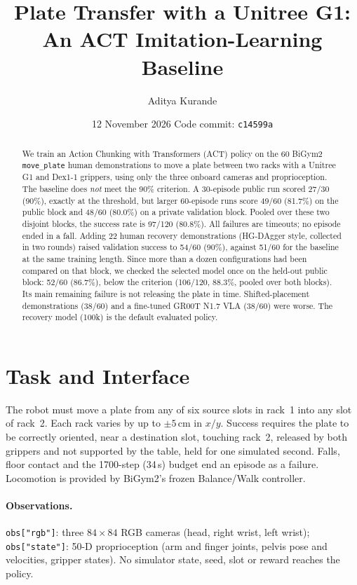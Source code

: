 \documentclass[11pt,a4paper]{article}
\title{Plate Transfer with a Unitree G1:\\An ACT Imitation-Learning Baseline}
\author{Aditya Kurande}
\date{12 November 2026 \quad Code commit: \texttt{c14599a}}
\begin{document}
\maketitle

\begin{abstract}
We train an Action Chunking with Transformers (ACT) policy on the 60 BiGym2
\texttt{move\_plate} human demonstrations to move a plate between two racks
with a Unitree G1 and Dex1-1 grippers, using only the three onboard cameras
and proprioception. The baseline does \emph{not} meet the 90\% criterion.
A 30-episode public run scored 27/30 (90\%), exactly at the threshold, but
larger 60-episode runs score 49/60 (81.7\%) on the public block and 48/60
(80.0\%) on a private validation block. Pooled over these two disjoint
blocks, the success rate is 97/120 (80.8\%). All failures are timeouts;
no episode ended in a fall.
Adding 22 human recovery demonstrations (HG-DAgger style, collected in two
rounds) raised validation success to 54/60 (90\%), against 51/60 for the
baseline at the same training length. Since more than a dozen configurations
had been compared on that block, we checked the selected model once on the
held-out public block: 52/60 (86.7\%), below the criterion (106/120, 88.3\%,
pooled over both blocks). Its main remaining failure is not releasing the
plate in time.
Shifted-placement demonstrations (38/60) and
a fine-tuned GR00T N1.7 VLA (38/60) were worse. The recovery model (100k)
is the default evaluated policy.
\end{abstract}

\section{Task and Interface}

The robot must move a plate from any of six source slots in rack~1 into any
slot of rack~2. Each rack varies by up to $\pm5$\,cm in $x/y$. Success requires the plate to be correctly
oriented, near a destination slot, touching rack~2, released by both
grippers and not supported by the table, held for one simulated second.
Falls, floor contact and the 1700-step (34\,s) budget end an episode as a
failure. Locomotion is provided by BiGym2's frozen Balance/Walk controller.

\paragraph{Observations.} \texttt{obs["rgb"]}: three $84\times84$ RGB
cameras (head, right wrist, left wrist); \texttt{obs["state"]}: 50-D
proprioception (arm and finger joints, pelvis pose and velocities, gripper
states). No simulator state, seed, slot or reward reaches the policy.
\end{document}
